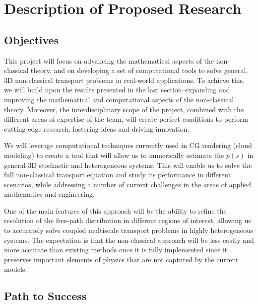 \documentclass[12pt]{article}
\begin{document}
\section{Description of Proposed Research}

\subsection{Objectives}

This project will focus on advancing the mathematical aspects of the non-classical theory, and on developing a set of computational tools to solve general, 3D non-classical transport problems in real-world applications.
To achieve this, we will build upon the results presented in the last section--expanding and improving the mathematical and computational aspects of the non-classical theory.
Moreover, the interdisciplinary scope of the project, combined with the different areas of expertise of the team, will create perfect conditions to perform cutting-edge research, fostering ideas and driving innovation.

We will leverage computational techniques currently used in CG rendering (cloud modeling) to create a tool that will allow us to numerically estimate the $p(s)$ in general 3D stochastic and heterogeneous systems.
This will enable us to solve the full non-classical transport equation and study its performance in different scenarios, while addressing a number of current challenges in the areas of applied mathematics and engineering.

One of the main features of this approach will be the ability to refine the resolution of the free-path distribution in different regions of interest, allowing us to accurately solve coupled multiscale transport problems in highly heterogeneous systems.
The expectation is that the non-classical approach will be less costly and more accurate than existing methods once it is fully implemented since it preserves important elements of physics that are not captured by the current models.

\subsection{Path to Success}
\end{document}
